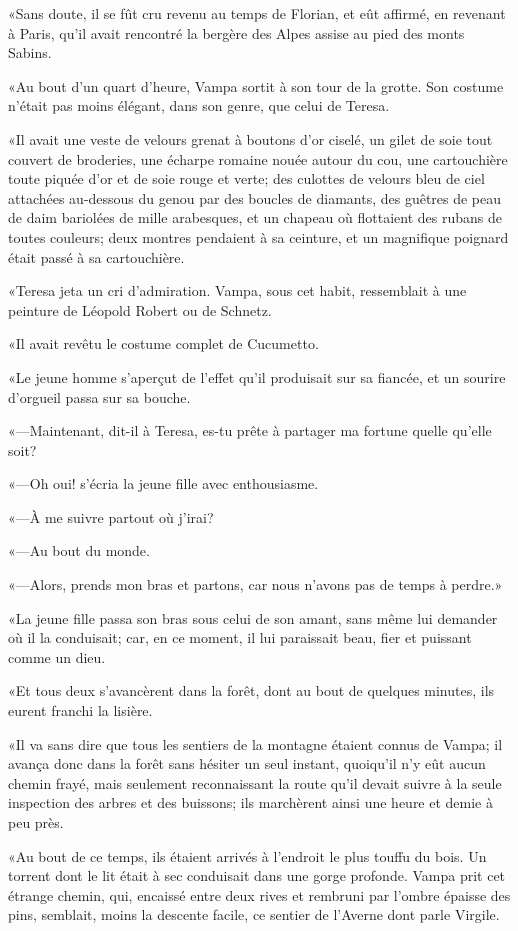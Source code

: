 «Sans doute, il se fût cru revenu au temps de Florian, et eût affirmé, en revenant à Paris, qu'il avait rencontré la bergère des Alpes assise au pied des monts Sabins. 

«Au bout d'un quart d'heure, Vampa sortit à son tour de la grotte. Son costume n'était pas moins élégant, dans son genre, que celui de Teresa. 

«Il avait une veste de velours grenat à boutons d'or ciselé, un gilet de soie tout couvert de broderies, une écharpe romaine nouée autour du cou, une cartouchière toute piquée d'or et de soie rouge et verte; des culottes de velours bleu de ciel attachées au-dessous du genou par des boucles de diamants, des guêtres de peau de daim bariolées de mille arabesques, et un chapeau où flottaient des rubans de toutes couleurs; deux montres pendaient à sa ceinture, et un magnifique poignard était passé à sa cartouchière. 

«Teresa jeta un cri d'admiration. Vampa, sous cet habit, ressemblait à une peinture de Léopold Robert ou de Schnetz. 

«Il avait revêtu le costume complet de Cucumetto. 

«Le jeune homme s'aperçut de l'effet qu'il produisait sur sa fiancée, et un sourire d'orgueil passa sur sa bouche. 

«—Maintenant, dit-il à Teresa, es-tu prête à partager ma fortune quelle qu'elle soit? 

«—Oh oui! s'écria la jeune fille avec enthousiasme. 

«—À me suivre partout où j'irai? 

«—Au bout du monde. 

«—Alors, prends mon bras et partons, car nous n'avons pas de temps à perdre.» 

«La jeune fille passa son bras sous celui de son amant, sans même lui demander où il la conduisait; car, en ce moment, il lui paraissait beau, fier et puissant comme un dieu. 

«Et tous deux s'avancèrent dans la forêt, dont au bout de quelques minutes, ils eurent franchi la lisière. 

«Il va sans dire que tous les sentiers de la montagne étaient connus de Vampa; il avança donc dans la forêt sans hésiter un seul instant, quoiqu'il n'y eût aucun chemin frayé, mais seulement reconnaissant la route qu'il devait suivre à la seule inspection des arbres et des buissons; ils marchèrent ainsi une heure et demie à peu près. 

«Au bout de ce temps, ils étaient arrivés à l'endroit le plus touffu du bois. Un torrent dont le lit était à sec conduisait dans une gorge profonde. Vampa prit cet étrange chemin, qui, encaissé entre deux rives et rembruni par l'ombre épaisse des pins, semblait, moins la descente facile, ce sentier de l'Averne dont parle Virgile. 

